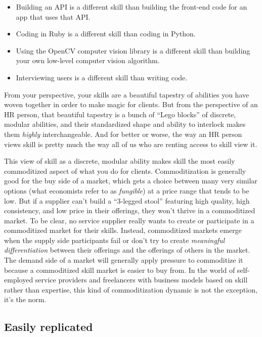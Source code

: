 \begin{itemize}
\item Building an API is a different skill than building the front-end code for an app that uses that API.
\item Coding in Ruby is a different skill than coding in Python.
\item Using the OpenCV computer vision library is a different skill than building your own low-level computer vision algorithm.
\item Interviewing users is a different skill than writing code.
\end{itemize}

From your perspective, your skills are a beautiful tapestry of abilities you have woven together in order to make magic for clients. But from the perspective of an HR person, that beautiful tapestry is a bunch of ``Lego blocks'' of discrete, modular abilities, and their standardized shape and ability to interlock makes them \emph{highly} interchangeable. And for better or worse, the way an HR person views skill is pretty much the way all of us who are renting access to skill view it.

This view of skill as a discrete, modular ability makes skill the most easily commoditized aspect of what you do for clients. Commoditization is generally good for the buy side of a market, which gets a choice between many very similar options (what economists refer to as \emph{fungible}) at a price range that tends to be low. But if a supplier can't build a ``3-legged stool'' featuring high quality, high consistency, and low price in their offerings, they won't thrive in a commoditized market. To be clear, no service supplier really wants to create or participate in a commoditized market for their skills. Instead, commoditized markets emerge when the supply side participants fail or don't try to create \emph{meaningful differentiation} between their offerings and the offerings of others in the market. The demand side of a market will generally apply pressure to commoditize it because a commoditized skill market is easier to buy from. In the world of self-employed service providers and freelancers with business models based on skill rather than expertise, this kind of commoditization dynamic is not the exception, it's the norm.

\subsection{Easily replicated}

